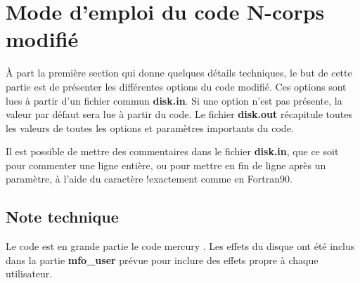 








\section{Mode d'emploi du code N-corps modifié}
À part la première section qui donne quelques détails techniques, le but de cette partie est de présenter les différentes options du code modifié. Ces options sont lues à partir d'un fichier commun \textbf{disk.in}. Si une option n'est pas présente, la valeur par défaut sera lue à partir du code. Le fichier \textbf{disk.out} récapitule toutes les valeurs de toutes les options et paramètres importants du code. 

\begin{remarque}
Il est possible de mettre des commentaires dans le fichier \textbf{disk.in}, que ce soit pour commenter une ligne entière, ou pour mettre en fin de ligne après un paramètre, à l'aide du caractère \og !\fg exactement comme en Fortran90.
\end{remarque}

\subsection{Note technique}
Le code est en grande partie le code mercury \cite{chambers1999hybrid}. Les effets du disque ont été inclus dans la partie \textbf{mfo\_user} prévue pour inclure des effets propre à chaque utilisateur. 


